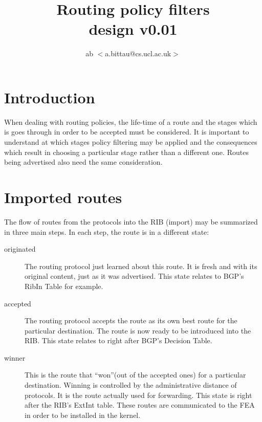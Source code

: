 \documentclass{article}
\title{Routing policy filters\\design v0.01}
\author{ab $<$a.bittau@cs.ucl.ac.uk$>$}
\begin{document}
\maketitle

\section{Introduction}
When dealing with routing policies, the life-time of a route and the stages
which is goes through in order to be accepted must be considered. It is
important to understand at which stages policy filtering may be applied and the
consequences which result in choosing a particular stage rather than a different
one. Routes being advertised also need the same consideration.

\section{Imported routes}
The flow of routes from the protocols into the RIB (import) may be summarized in
three main steps. In each step, the route is in a different state:
\begin{description}
\item[originated] The routing protocol just learned about this route. It is
fresh and with its original content, just as it was advertised. This state
relates to BGP's RibIn Table for example.
\item[accepted] The routing protocol accepts the route as its own best route for
the particular destination. The route is now ready to be introduced into the RIB.
This state relates to right after BGP's Decision Table.
\item[winner] This is the route that ``won''(out of the accepted ones) for a
particular destination. Winning is controlled by the administrative distance of
protocols. It is the route actually used for forwarding.  This state is right
after the RIB's ExtInt table. These routes are communicated to the FEA in order
to be installed in the kernel.
\end{description}
\end{document}

